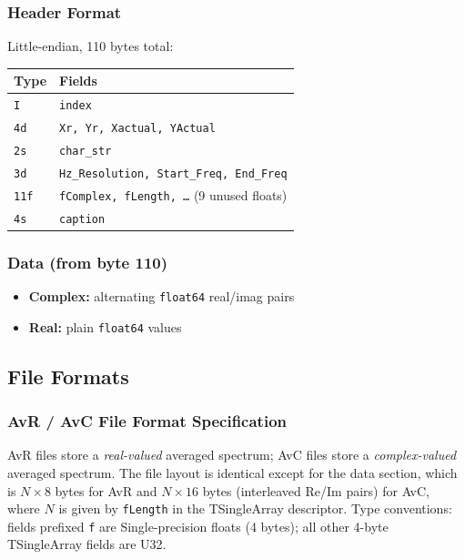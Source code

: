 \documentclass[11pt, oneside]{article}   	%
\begin{document}
\subsubsection*{Header Format}
Little-endian, 110 bytes total:

\begin{tabular}{ll}
\toprule
\textbf{Type} & \textbf{Fields} \\
\midrule
\texttt{I}    & \texttt{index} \\
\texttt{4d}   & \texttt{Xr, Yr, Xactual, YActual} \\
\texttt{2s}   & \texttt{char\_str} \\
\texttt{3d}   & \texttt{Hz\_Resolution, Start\_Freq, End\_Freq} \\
\texttt{11f}  & \texttt{fComplex, fLength, \ldots} (9 unused floats) \\
\texttt{4s}   & \texttt{caption} \\
\bottomrule
\end{tabular}

\subsubsection*{Data (from byte 110)}
\begin{itemize}
    \item \textbf{Complex:} alternating \texttt{float64} real/imag pairs
    \item \textbf{Real:} plain \texttt{float64} values
\end{itemize}


\subsection{File Formats}
 
\subsubsection{AvR / AvC File Format Specification}
\noindent AvR files store a \textit{real-valued} averaged spectrum; AvC files store a \textit{complex-valued} averaged spectrum.
The file layout is identical except for the data section, which is $N \times 8$ bytes for AvR and $N \times 16$ bytes (interleaved Re/Im pairs) for AvC,
where $N$ is given by \texttt{fLength} in the TSingleArray descriptor.
Type conventions: fields prefixed \texttt{f} are Single-precision floats (4 bytes); all other 4-byte TSingleArray fields are U32.
 
\end{document}
